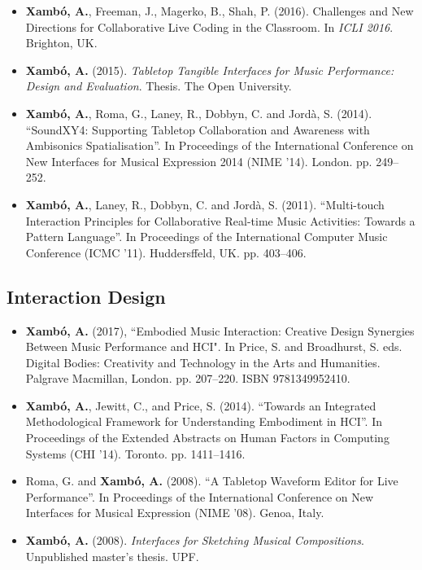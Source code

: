\documentclass[10pt, a4paper]{article}
\begin{document}
\begin{itemize}
\item \textbf{Xambó, A.}, Freeman, J., Magerko, B., Shah, P. (2016). Challenges and New Directions for Collaborative Live Coding in the Classroom. In \emph{ICLI 2016}. Brighton, UK.
\item \textbf{Xambó, A.} (2015). \emph{Tabletop Tangible Interfaces for Music Performance: Design and Evaluation}. Thesis. The Open University.
\item \textbf{Xambó, A.}, Roma, G., Laney, R., Dobbyn, C. and Jordà, S. (2014). “SoundXY4: Supporting Tabletop Collaboration and Awareness with Ambisonics Spatialisation”. In Proceedings of the International Conference on New Interfaces for Musical Expression 2014 (NIME ’14). London. pp. 249–252.
\item \textbf{Xambó, A.}, Laney, R., Dobbyn, C. and Jordà, S. (2011). “Multi-touch Interaction Principles for Collaborative Real-time Music Activities: Towards a Pattern Language”. In Proceedings of the International Computer Music Conference (ICMC ’11). Huddersffeld, UK. pp. 403–406.
\end{itemize}

\subsection*{Interaction Design}

\begin{itemize}
\item \textbf{Xambó, A.} (2017), “Embodied Music Interaction: Creative Design Synergies Between Music Performance and HCI". In Price, S. and Broadhurst, S. eds. Digital Bodies: Creativity and Technology in the Arts and Humanities. Palgrave Macmillan, London. pp. 207--220. ISBN 9781349952410.
\item \textbf{Xambó, A.}, Jewitt, C., and Price, S. (2014). “Towards an Integrated Methodological Framework for Understanding Embodiment in HCI”. In Proceedings of the Extended Abstracts on Human Factors in Computing Systems (CHI ’14). Toronto. pp. 1411--1416.
\item Roma, G. and \textbf{Xambó, A.} (2008). “A Tabletop Waveform Editor for Live Performance”. In Proceedings of the International Conference on New Interfaces for Musical Expression (NIME ’08). Genoa, Italy.
\item \textbf{Xambó, A.} (2008). \emph{Interfaces for Sketching Musical Compositions}. Unpublished master’s thesis. UPF.
\end{itemize}
\end{document}
